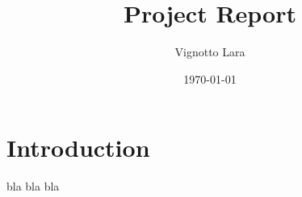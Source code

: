 \documentclass[a4paper,11pt]{article}
\title{\Huge Project Report}
\author{Vignotto Lara}
\date{\today}
\begin{document}
\maketitle
\vspace{1cm}
\tableofcontents
\vspace{3cm}

\section{Introduction}
bla bla bla
\end{document}
